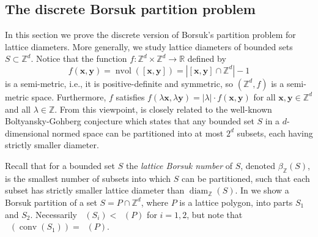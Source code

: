 \documentclass[11pt]{article}
\newcommand{\bx}{\mathbf{x}}
\newcommand{\by}{\mathbf{y}}
\newcommand{\R}{\mathbb{R}}
\newcommand{\Z}{\mathbb{Z}}
\DeclareMathOperator{\conv}{conv}
\DeclareMathOperator{\ldiam}{diam_\Z}
\DeclareMathOperator{\diam}{diam}
\DeclareMathOperator{\nvol}{nvol}
\begin{document}
   




\subsection{The discrete Borsuk partition problem}\label{sec:2.4}

In this section we prove the discrete version of Borsuk's partition problem for lattice diameters. More generally, we study lattice diameters of bounded sets $S \subset \Z^d$. 
Notice that the function $f : \Z^d \times \Z^d \to \R$ defined by  
\[
f(\bx, \by) = \nvol([\bx, \by]) = |[\bx, \by] \cap \Z^d| - 1
\]  
    is a semi-metric, i.e., it is positive-definite and symmetric, so $(\Z^d, f)$ is a semi-metric space. Furthermore, $f$ satisfies $f(\lambda \bx, \lambda \by) = |\lambda| \cdot f(\bx,\by)$ for all $\bx,\by \in \Z^d$ and all $\lambda \in \Z$. From this viewpoint,  is closely related to the well-known Boltyansky-Gohberg conjecture \cite{boltjansky1985results} which states that any bounded set $S$ in a $d$-dimensional normed space can be partitioned into at most $2^d$ subsets, each having strictly smaller diameter.

Recall that for a bounded set $S$ the \emph{lattice Borsuk number} of $S$, denoted $\beta_\Z(S)$, is the smallest number of subsets into which $S$ can be partitioned, such that each subset has strictly smaller lattice diameter than $\diam_{\Z} (S)$. In \mbox{} we show a Borsuk partition of a set $S=P \cap \Z^d$, where $P$ is a lattice polygon, into parts $S_1$ and $S_2$. Necessarily $\ldiam(S_i)< \ldiam(P)$ for $i=1,2$, but 
note that $\ldiam (\conv (S_1)) = \ldiam(P)$.

\end{document}
